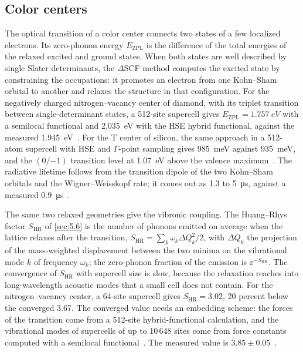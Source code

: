 \subsection{Color centers}

The optical transition of a color center connects two states of a few localized electrons. Its zero-phonon energy $E_{\mathrm{ZPL}}$ is the difference of the total energies of the relaxed excited and ground states. When both states are well described by single Slater determinants, the $\Delta$SCF method computes the excited state by constraining the occupations: it promotes an electron from one Kohn--Sham orbital to another and relaxes the structure in that configuration. For the negatively charged nitrogen--vacancy center of diamond, with its triplet transition between single-determinant states, a 512-site supercell gives $E_{\mathrm{ZPL}} = \SI{1.757}{eV}$ with a semilocal functional and \SI{2.035}{eV} with the HSE hybrid functional, against the measured \SI{1.945}{eV}~\cite[Sect.~4.1]{alkauskas2014first}. For the T center of silicon, the same approach in a 512-atom supercell with HSE and $\Gamma$-point sampling gives \SI{985}{meV} against \SI{935}{meV}, and the $(0/{-1})$ transition level at \SI{1.07}{eV} above the valence maximum~\cite{dhaliah2022first}. The radiative lifetime follows from the transition dipole of the two Kohn--Sham orbitals and the Wigner--Weisskopf rate; it comes out as 1.3 to \SI{5}{\micro s}, against a measured \SI{0.9}{\micro s}~\cite{dhaliah2022first}.

The same two relaxed geometries give the vibronic coupling. The Huang--Rhys factor $S_{\mathrm{HR}}$ of \cref{sec:5.6} is the number of phonons emitted on average when the lattice relaxes after the transition, $S_{\mathrm{HR}} = \sum_k\omega_k\Delta Q_k^2/2$, with $\Delta Q_k$ the projection of the mass-weighted displacement between the two minima on the vibrational mode $k$ of frequency $\omega_k$; the zero-phonon fraction of the emission is $\ee^{-S_{\mathrm{HR}}}$. The convergence of $S_{\mathrm{HR}}$ with supercell size is slow, because the relaxation reaches into long-wavelength acoustic modes that a small cell does not contain. For the nitrogen--vacancy center, a 64-site supercell gives $S_{\mathrm{HR}} = 3.02$, 20 percent below the converged 3.67. The converged value needs an embedding scheme: the forces of the transition come from a 512-site hybrid-functional calculation, and the vibrational modes of supercells of up to 10\,648 sites come from force constants computed with a semilocal functional~\cite[Sects.~2.3 and~4.2]{alkauskas2014first}. The measured value is $3.85 \pm 0.05$~\cite[Sect.~3]{alkauskas2014first}.

